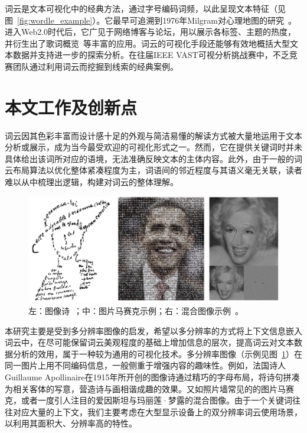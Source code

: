 
词云是文本可视化中的经典方法，通过字号编码词频，以此呈现文本特征（见图~\ref{fig:wordle_example}）。它最早可追溯到1976年Milgram对心理地图的研究~\supercite{milgram1976}。进入Web2.0时代后，它广见于网络博客与论坛，用以展示各标签、主题的热度，并衍生出了歌词概览~\supercite{Burch2016}等丰富的应用。词云的可视化手段还能够有效地概括大型文本数据并支持进一步的探索分析。在往届IEEE VAST可视分析挑战赛中，不乏竞赛团队通过利用词云而挖掘到线索的经典案例。


\section{本文工作及创新点}
词云因其色彩丰富而设计感十足的外观与简洁易懂的解读方式被大量地运用于文本分析或展示，成为当今最受欢迎的可视化形式之一。然而，它在提供关键词时并未具体给出该词所对应的语境，无法准确反映文本的主体内容。此外，由于一般的词云布局算法以优化整体紧凑程度为主，词语间的邻近程度与其语义毫无关联，读者难以从中梳理出逻辑，构建对词云的整体理解。

\begin{figure}[htbp]
	\centering
	\includegraphics[width=\textwidth]{figures/intro.png}
	\caption{左：图像诗~\supercite{apollinaire1971selected}；中：图片马赛克示例；右：混合图像示例~\supercite{Olivia2006}。}
	\label{fig:intro}
\end{figure}


本研究主要是受到多分辨率图像的启发，希望以多分辨率的方式将上下文信息嵌入词云中，在尽可能保留词云美观程度的基础上增加信息的层次，提高词云对文本数据分析的效用，属于一种较为通用的可视化技术。多分辨率图像（示例见图~\ref{fig:intro}）在同一图片上用不同编码信息，一般侧重于增强内容的趣味性。例如，法国诗人Guillaume Apollinaire在1915年所开创的图像诗通过精巧的字母布局，将诗句拼凑为相关客体的写意，营造诗与画相谐成趣的效果。又如照片墙常见的的图片马赛克，或者一度引人注目的爱因斯坦与玛丽莲·梦露的混合图像。由于一个关键词往往对应大量的上下文，我们主要考虑在大型显示设备上的双分辨率词云使用场景，以利用其面积大、分辨率高的特性。

